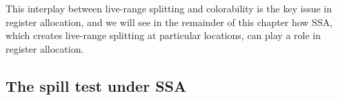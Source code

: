 {This interplay between live-range splitting and colorability is the key issue in register allocation, and we will see in the remainder of this chapter how SSA, which creates live-range splitting at particular locations, can play a role in register allocation.



\subsection{The spill test under SSA}

}
